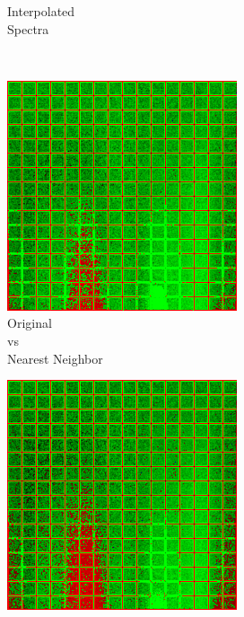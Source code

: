 \begin{figure}[t]
\begin{subfigure}[t]{0.22\textwidth}
		\caption{Interpolated\\Spectra}
		\label{fig:sigUpliftInterpSpectra}
	\end{subfigure}
	\vspace{0.5em}\\
	\begin{subfigure}[t]{0.22\textwidth}
		\includegraphics[width=\linewidth]{img/uplifting_diff_originalNeighbor.png}
		\caption{Original\\vs\\Nearest Neighbor}
		\label{fig:sigDiffOrigNeighbor}
	\end{subfigure} \hspace{0.1em}
	\begin{subfigure}[t]{0.22\textwidth}
		\includegraphics[width=\linewidth]{img/uplifting_diff_originalSpectra.png}

\end{subfigure}
\end{figure}
